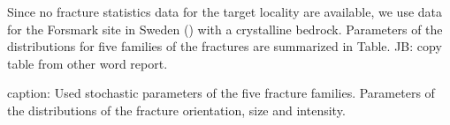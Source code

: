 \documentclass{article}
\newcommand{\vc}[1]{\boldsymbol{#1}}
\newcommand{\todo}[1]{{\color{red}#1}}
\begin{document}
Since no fracture statistics data for the target locality are available, we use data for the Forsmark site in Sweden
(\cite{Follin}) with a crystalline bedrock. Parameters of the distributions for five families of the fractures are summarized in Table.
\todo{JB: copy table from other word report}.

caption: Used stochastic parameters of the five fracture families. Parameters of the distributions of the fracture orientation, size and intensity.

\end{document}

